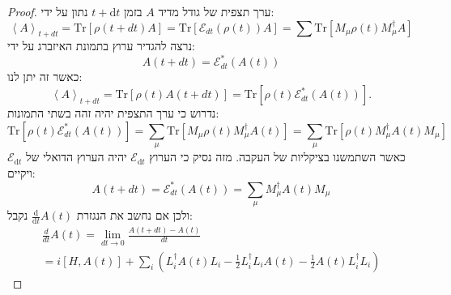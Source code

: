 \documentclass{tstextbook}
\begin{document}
\begin{proof}
ערך תצפית של גודל מדיד \(A\) בזמן \(t+\mathrm{d}t\) נתון על ידי:
$$\left\langle A\right\rangle_{t+d t}=\mathrm{Tr}\left[\rho\left(t+d t\right)A\right]=\mathrm{Tr}\left[\mathcal{E}_{d t}\left(\rho\left(t\right)\right)A\right]=\sum\mathrm{Tr}\left[M_{\mu}\rho\left(t\right)M_{\mu}^{\dagger}A\right]$$
נרצה להגדיר ערוץ בתמונת האיזברג על ידי:
$$A\left(t+d t\right)=\mathcal{E}_{d t}^{*}\left(A\left(t\right)\right)$$
כאשר זה יתן לנו:
$$\left\langle A\right\rangle_{t+d t}=\mathrm{Tr}\left[\rho\left(t\right)A\left(t+d t\right)\right]=\mathrm{Tr}\left[\rho\left(t\right)\mathcal{E}_{d t}^{\ast}\left(A\left(t\right)\right)\right].$$
נדרוש כי ערך התצפית יהיה זהה בשתי התמונות:
$$\mathrm{Tr}\left[\rho\left(t\right)\mathcal{E}_{d t}^{\ast}\left(A\left(t\right)\right)\right]=\sum_{\mu}\mathrm{Tr}\left[M_{\mu}\rho\left(t\right)M_{\mu}^{\dagger}A\left(t\right)\right]=\sum_{\mu}\mathrm{Tr}\left[\rho\left(t\right)M_{\mu}^{\dagger}A\left(t\right)M_{\mu}\right]$$
כאשר השתמשנו בציקליות של העקבה. מזה נסיק כי הערוץ \(\mathcal{E}_{\mathrm{d}t}\) יהיה הערוץ הדואלי של \(\mathcal{E}_{\mathrm{d}t}\) ויקיים:
$$A\left(t+d t\right)=\mathcal{E}_{d t}^{*}\left(A\left(t\right)\right)=\sum_{\mu}M_{\mu}^{\dagger}A\left(t\right)M_{\mu}$$
ולכן אם נחשב את הנגזרת \(\frac{\mathrm{d} }{\mathrm{d} t}A(t)\) נקבל:
\begin{gather*}{{\frac{d}{d t}A\left(t\right)=\operatorname*{lim}_{d t\longrightarrow0}\frac{A\left(t+d t\right)-A\left(t\right)}{d t}}}\\ {{=i\left[H,A\left(t\right)\right]+\sum_{i}\left(L_{i}^{\dagger}A\left(t\right)L_{i}-\frac{1}{2}L_{i}^{\dagger}L_{i}A\left(t\right)-\frac{1}{2}A\left(t\right)L_{i}^{\dagger}L_{i}\right)}}\end{gather*}

\end{proof}
\end{document}
